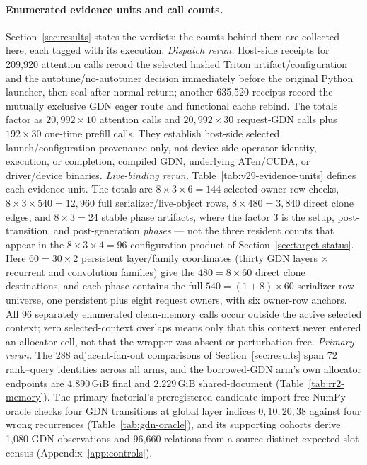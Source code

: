 \documentclass{article}
\newcommand{\gib}{\,\mathrm{GiB}}
\begin{document}
\paragraph{Enumerated evidence units and call counts.}
Section~\ref{sec:results} states the verdicts; the counts behind them are
collected here, each tagged with its execution.
\emph{Dispatch rerun.}  Host-side receipts for 209,920 attention calls record
the selected hashed Triton artifact/configuration and the
autotune/no-autotuner decision immediately before the original Python launcher,
then seal after normal return; another 635,520 receipts record the mutually
exclusive GDN eager route and functional cache rebind.  The totals factor as
$20{,}992\times10$ attention calls and $20{,}992\times30$ request-GDN calls plus
$192\times30$ one-time prefill calls.  They establish host-side selected
launch/configuration provenance only, not device-side operator identity,
execution, or completion, compiled GDN, underlying ATen/CUDA, or driver/device
binaries.
\emph{Live-binding rerun.}  Table~\ref{tab:v29-evidence-units} defines each
evidence unit.  The totals are $8\times3\times6=144$ selected-owner-row checks,
$8\times3\times540=12{,}960$ full serializer/live-object rows,
$8\times480=3{,}840$ direct clone edges, and $8\times3=24$ stable phase
artifacts, where the factor $3$ is the setup, post-transition, and
post-generation \emph{phases} --- not the three resident counts that appear in
the $8\times3\times4=96$ configuration product of
Section~\ref{sec:target-status}.  Here $60=30\times2$ persistent layer/family
coordinates (thirty GDN layers $\times$ recurrent and convolution families)
give the $480=8\times60$ direct clone destinations, and each phase contains the
full $540=(1+8)\times60$ serializer-row universe, one persistent plus eight
request owners, with six owner-row anchors.  All 96 separately enumerated
clean-memory calls occur outside the active selected context; zero
selected-context overlaps means only that this context never entered an
allocator cell, not that the wrapper was absent or perturbation-free.
\emph{Primary rerun.}  The 288 adjacent-fan-out comparisons of
Section~\ref{sec:results} span 72 rank--query identities across all arms, and
the borrowed-GDN arm's own allocator endpoints are $4.890\gib$ final and
$2.229\gib$ shared-document (Table~\ref{tab:rr2-memory}).  The primary
factorial's preregistered candidate-import-free NumPy oracle checks four GDN
transitions at global layer indices $0,10,20,38$ against four wrong
recurrences (Table~\ref{tab:gdn-oracle}), and its supporting cohorts derive
1,080 GDN observations and 96,660 relations from a source-distinct
expected-slot census (Appendix~\ref{app:controls}).
\end{document}

